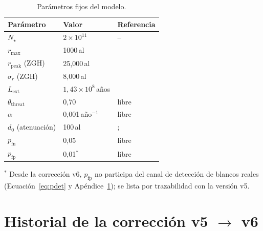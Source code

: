\documentclass[useAMS,usenatbib,onecolumn]{mn2e}
\begin{document}
\begin{table}
  \centering
  \caption{Parámetros fijos del modelo.}
  \label{tab:params}
  \begin{tabular}{lll}
    \toprule
    Parámetro & Valor & Referencia \\
    \midrule
    $N_\star$ & $2\times10^{11}$ & -- \\
    $r_\text{max}$ & 1000\,al & \citet{troitskij1989,loeb2007} \\
    $r_\text{peak}$ (ZGH) & 25{,}000\,al & \citet{lineweaver2004} \\
    $\sigma_r$ (ZGH) & 8{,}000\,al & \citet{lineweaver2004} \\
    $L_\text{ext}$ & $1{,}43\times10^8$\,años & \citet{sandberg2018} \\
    $\theta_\text{threat}$ & 0{,}70 & libre \\
    $\alpha$ & 0{,}001\,año$^{-1}$ & libre \\
    $d_0$ (atenuación) & 100\,al & \citet{loeb2007}; \citet{forgannichol2011} \\
    $p_\text{fn}$ & 0{,}05 & libre \\
    $p_\text{fp}$ & 0{,}01$^{*}$ & libre \\
    \bottomrule
  \end{tabular}
  \begin{flushleft}
    \footnotesize
    $^{*}$ Desde la corrección v6, $p_\text{fp}$ no participa del canal
    de detección de blancos reales (Ecuación~\ref{eq:pdet} y
    Apéndice~\ref{app:correction}); se lista por trazabilidad con la
    versión v5.
  \end{flushleft}
\end{table}

\section{Historial de la corrección v5 $\to$ v6}
\label{app:correction}
\end{document}
